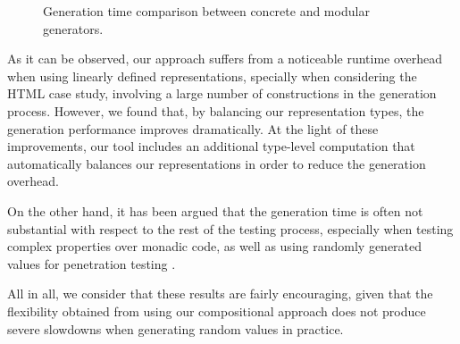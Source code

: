 \begin{figure}[t]
  \centering
  \caption{Generation time comparison between concrete and modular generators.}
  \label{fig:times}
\end{figure}
%
As it can be observed, our approach suffers from a noticeable runtime overhead
when using linearly defined representations, specially when considering the HTML
case study, involving a large number of constructions in the generation process.
%
However, we found that, by balancing our representation types, the generation
performance improves dramatically.
%
At the light of these improvements, our tool includes an additional type-level
computation that automatically balances our representations in order to reduce
the generation overhead.


On the other hand, it has been argued that the generation time is often not
substantial with respect to the rest of the testing process, especially when
testing complex properties over monadic code, as well as using randomly
generated values for penetration testing
\cite{DBLP:conf/haskell/MistaRH18,grieco2017}.


All in all, we consider that these results are fairly encouraging, given that
the flexibility obtained from using our compositional approach does not produce
severe slowdowns when generating random values in practice.

